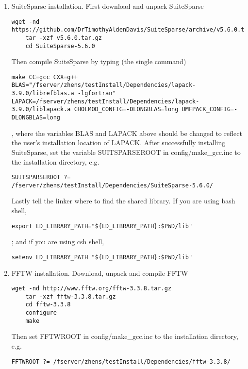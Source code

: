 \documentclass[english,11pt]{article}
\begin{document}
\begin{enumerate}
    \item SuiteSparse installation. First download and unpack SuiteSparse
    \begin{lstlisting}[breaklines=true, showstringspaces=false]
    wget -nd https://github.com/DrTimothyAldenDavis/SuiteSparse/archive/v5.6.0.tar.gz
    tar -xzf v5.6.0.tar.gz
    cd SuiteSparse-5.6.0
    \end{lstlisting}
    Then compile SuiteSparse by typing (the single command)
    \begin{lstlisting}[breaklines=true, showstringspaces=false]
    make CC=gcc CXX=g++ BLAS="/fserver/zhens/testInstall/Dependencies/lapack-3.9.0/librefblas.a -lgfortran" LAPACK=/fserver/zhens/testInstall/Dependencies/lapack-3.9.0/liblapack.a CHOLMOD_CONFIG=-DLONGBLAS=long UMFPACK_CONFIG=-DLONGBLAS=long 
    \end{lstlisting}
    , where the variables BLAS and LAPACK above should be changed to reflect the user's installation location of LAPACK. After successfully installing SuiteSparse, set the variable SUITSPARSEROOT in config/make_gcc.inc to the installation directory, e.g. 
    \begin{lstlisting}[breaklines=true, showstringspaces=false]
    SUITSPARSEROOT ?= /fserver/zhens/testInstall/Dependencies/SuiteSparse-5.6.0/
    \end{lstlisting}
    Lastly tell the linker where to find the shared library. If you are using bash shell,
    \begin{lstlisting}[breaklines=true, showstringspaces=false]
    export LD_LIBRARY_PATH="${LD_LIBRARY_PATH}:$PWD/lib"
    \end{lstlisting}
    ; and if you are using csh shell,
    \begin{lstlisting}[breaklines=true, showstringspaces=false]
    setenv LD_LIBRARY_PATH "${LD_LIBRARY_PATH}:$PWD/lib" 
    \end{lstlisting}
    
    \item FFTW installation. Download, unpack and compile FFTW
    \begin{lstlisting}[breaklines=true, showstringspaces=false]
    wget -nd http://www.fftw.org/fftw-3.3.8.tar.gz
    tar -xzf fftw-3.3.8.tar.gz
    cd fftw-3.3.8
    configure
    make
    \end{lstlisting}
    Then set FFTWROOT in config/make_gcc.inc to the installation directory, e.g. 
    \begin{lstlisting}[breaklines=true, showstringspaces=false]
    FFTWROOT ?= /fserver/zhens/testInstall/Dependencies/fftw-3.3.8/
    \end{lstlisting}
    

\end{enumerate}
\end{document}
